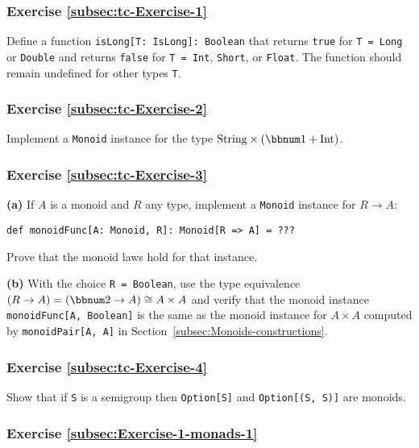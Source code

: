 \subsubsection{Exercise \label{subsec:tc-Exercise-1}\ref{subsec:tc-Exercise-1}}

Define a function \lstinline!isLong[T: IsLong]: Boolean! that returns
\lstinline!true! for \lstinline!T = Long! or \lstinline!Double!
and returns \lstinline!false! for \lstinline!T = Int!, \lstinline!Short!,
or \lstinline!Float!. The function should remain undefined for other
types \lstinline!T!.

\subsubsection{Exercise \label{subsec:tc-Exercise-2}\ref{subsec:tc-Exercise-2}}

Implement a \lstinline!Monoid! instance for the type $\text{String}\times(\bbnum 1+\text{Int})$.

\subsubsection{Exercise \label{subsec:tc-Exercise-3}\ref{subsec:tc-Exercise-3}}

\textbf{(a)} If $A$ is a monoid and $R$ any type, implement a \lstinline!Monoid!
instance for $R\rightarrow A$:
\begin{lstlisting}
def monoidFunc[A: Monoid, R]: Monoid[R => A] = ???
\end{lstlisting}
Prove that the monoid laws hold for that instance.

\textbf{(b)} With the choice \lstinline!R = Boolean!, use the type
equivalence $(R\rightarrow A)=(\bbnum 2\rightarrow A)\cong A\times A$
and verify that the monoid instance \lstinline!monoidFunc[A, Boolean]!
is the same as the monoid instance for $A\times A$ computed by \lstinline!monoidPair[A, A]!
in Section~\ref{subsec:Monoids-constructions}.

\subsubsection{Exercise \label{subsec:tc-Exercise-4}\ref{subsec:tc-Exercise-4}}

Show that if \lstinline!S! is a semigroup then \lstinline!Option[S]!
and \lstinline!Option[(S, S)]! are monoids.

\subsubsection{Exercise \label{subsec:Exercise-1-monads-1}\ref{subsec:Exercise-1-monads-1}}

